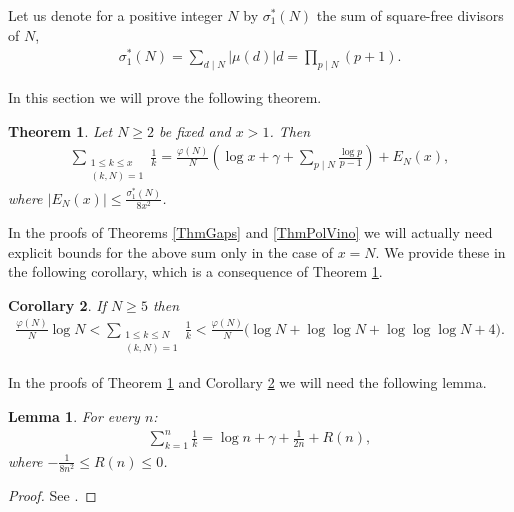 \documentclass[a4paper]{amsart}
\newtheorem{theorem}{Theorem}[section]
\newtheorem{cor}[theorem]{Corollary}
\newtheorem{lem}{Lemma}
\newcommand{\1}{\mathbbm{1}}
\begin{document}
Let us denote for a positive integer $N$ by $\sigma_{1}^{*}(N)$ the sum of square-free divisors of $N$,
\begin{align*}
\sigma_{1}^{*}(N) = \sum_{d\mid N}|\mu (d)|d = \prod_{p\mid N}\left(p+1\right).
\end{align*}

In this section we will prove the following theorem.

\begin{theorem}\label{MAINTHM}
Let $N\geq 2$ be fixed and $x>1$. Then
\begin{align*}
\sum_{\substack{1\leq k\leq x \\ (k,N)=1 }}\frac{1}{k} = \frac{\varphi (N)}{N}\left(\log x + \gamma + \sum_{p\mid N}\frac{\log p}{p-1}\right) + E_{N}(x),
\end{align*}
where $|E_{N}(x)|\leq \frac{\sigma_{1}^{*}(N)}{8x^{2}}$.
\end{theorem}

In the proofs of Theorems \ref{ThmGaps} and \ref{ThmPolVino} we will actually need explicit bounds for the above sum only in the case of $x=N$. We provide these in the following corollary, which is a consequence of Theorem \ref{MAINTHM}.

\begin{cor}\label{MAINCOR}
If $N\geq 5$ then
\begin{align*}
\frac{\varphi (N)}{N}\log N < \sum_{\substack{1\leq k\leq N \\ (k,N)=1 }}\frac{1}{k} < \frac{\varphi (N)}{N}\big(\log N + \log\log N + \log\log\log N + 4\big).
\end{align*}
\end{cor}


In the proofs of Theorem \ref{MAINTHM} and Corollary \ref{MAINCOR} we will need the following lemma.


\begin{lem}\label{HarmonicBound}
For every $n$:
\begin{align*}
\sum_{k=1}^{n}\frac{1}{k}=\log n+\gamma+\frac{1}{2n}+R(n),
\end{align*}
where $-\frac{1}{8n^{2}}\leq R(n)\leq 0$.
\end{lem}
\begin{proof}
See \cite[Section 2]{BW}.
\end{proof}
\end{document}
